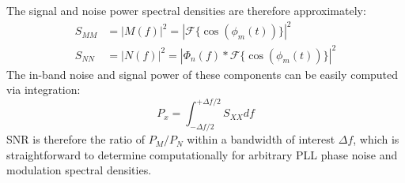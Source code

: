 		The signal and noise power spectral densities are therefore approximately:
		\begin{align}
			S_{MM} &= |M(f)|^2 = |\mathcal{F}\{\cos(\phi_m(t))\}|^2\\
			S_{NN} &= |N(f)|^2 = |\Phi_n(f)*\mathcal{F}\{\cos(\phi_m(t))\}|^2
		\end{align}
		The in-band noise and signal power of these components can be easily computed via integration:
		\begin{equation}
			P_x = \int^{+\Delta f/2}_{-\Delta f/2}S_{XX}df
		\end{equation}
		SNR is therefore the ratio of $P_M/P_N$ within a bandwidth of interest $\Delta f$, which is straightforward to determine computationally for arbitrary PLL phase noise and modulation spectral densities.


    \pagebreak
	\printbibliography


	\pagebreak
	


